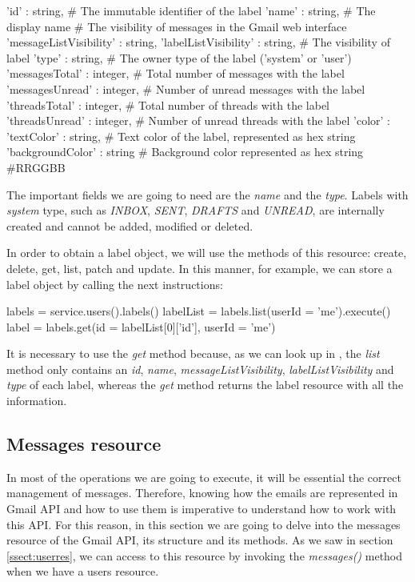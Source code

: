 \begin{python}
{
'id' : string, # The immutable identifier of the label
'name' : string, # The display name
# The visibility of messages in the Gmail web interface
'messageListVisibility' : string,
'labelListVisibility' : string, # The visibility of label
'type' : string, # The owner type of the label ('system' or 'user')
'messagesTotal' : integer, # Total number of messages with the label
'messagesUnread' : integer, # Number of unread messages with the label
'threadsTotal' : integer, # Total number of threads with the label
'threadsUnread' : integer, # Number of unread threads with the label
'color' : {
	'textColor' : string, # Text color of the label, represented as hex string
	'backgroundColor' : string # Background color represented as hex string #RRGGBB
	}
}
\end{python}

The important fields we are going to need are the \textit{name} and the \textit{type}. Labels with \textit{system} type, such as \textit{INBOX}, \textit{SENT}, \textit{DRAFTS} and \textit{UNREAD}, are internally created and cannot be added, modified or deleted.

In order to obtain a label object, we will use the methods of this resource: create, delete, get, list, patch and update. In this manner, for example, we can store a label object by calling the next instructions:

\begin{python}
labels = service.users().labels()
labelList = labels.list(userId = 'me').execute()
label = labels.get(id = labelList[0]['id'], userId = 'me')
\end{python}

It is necessary to use the \textit{get} method because, as we can look up in \cite[/v1/reference/users/labels/list]{gmailAPI}, the \textit{list} method only contains an \textit{id}, \textit{name}, \textit{messageListVisibility}, \textit{labelListVisibility} and \textit{type} of each label, whereas the \textit{get} method returns the label resource with all the information.

\subsection{Messages resource}
In most of the operations we are going to execute, it will be essential the correct management of messages. Therefore, knowing how the emails are represented in Gmail API and how to use them is imperative to understand how to work with this API. For this reason, in this section we are going to delve into the messages resource of the Gmail API, its structure and its methods. As we saw in section \ref{ssect:userres}, we can access to this resource by invoking the \textit{messages()} method when we have a users resource.

